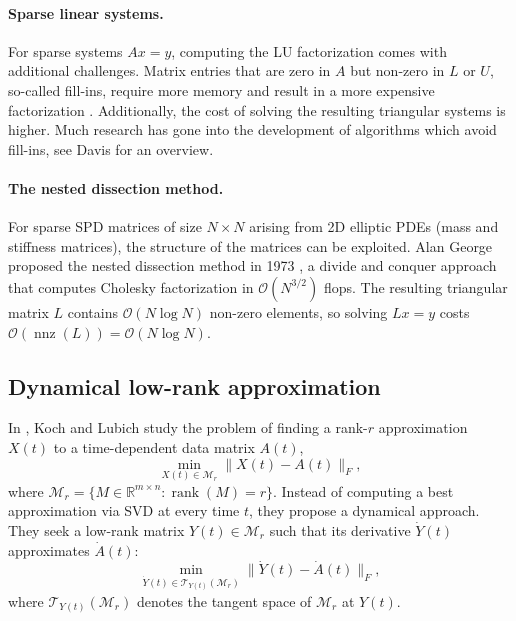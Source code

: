 \paragraph{Sparse linear systems.} For sparse systems $A x = y$, computing the LU factorization comes with additional challenges. Matrix entries that are zero in $A$ but non-zero in $L$ or $U$, so-called fill-ins, require more memory and result in a more expensive factorization \cite{larsonFiniteElementMethod2013}. Additionally, the cost of solving the resulting triangular systems is higher. Much research has gone into the development of algorithms which avoid fill-ins, see Davis \cite{davisDirectMethodsSparse2006} for an overview.


\paragraph{The nested dissection method.} For sparse SPD matrices of size $N \times N$ arising from 2D elliptic PDEs (mass and stiffness matrices), the structure of the matrices can be exploited. Alan George proposed the nested dissection method in 1973 \cite{georgeNestedDissectionRegular1973}, a divide and conquer approach that computes Cholesky factorization in $\mathcal{O}(N^{3/2})$ flops. The resulting triangular matrix $L$ contains $\mathcal{O}(N \log N)$ non-zero elements, so solving $L x = y$ costs $\mathcal{O}(\operatorname{nnz}(L)) = \mathcal{O}(N \log N)$.


\subsection{Dynamical low-rank approximation}\label{appendix:dynamical_low_rank_approximation}
In \cite{kochDynamicalLowrankApproximation2007}, Koch and Lubich study the problem of finding a rank-$r$ approximation $X(t)$ to a time-dependent data matrix $A(t)$,
\begin{equation*}
    \min_{X(t) \in \mathcal{M}_r} \| X(t) - A(t) \|_F,
\end{equation*}
where $\mathcal{M}_r = \{M \in \mathbb{R}^{m \times n} : \operatorname{rank}(M) = r \}$. Instead of computing a best approximation via SVD at every time $t$, they propose a dynamical approach. They seek a low-rank matrix $Y(t) \in \mathcal{M}_r$ such that its derivative $\dot{Y}(t)$ approximates $\dot{A}(t)$:
\begin{equation}\label{eq:dlra1}
    \min_{\dot{Y}(t) \in \mathcal{T}_{Y(t)}(\mathcal{M}_r)} \| \dot{Y}(t) - \dot{A}(t) \|_F,
\end{equation}
where $\mathcal{T}_{Y(t)}(\mathcal{M}_r)$ denotes the tangent space of $\mathcal{M}_r$ at $Y(t)$.


